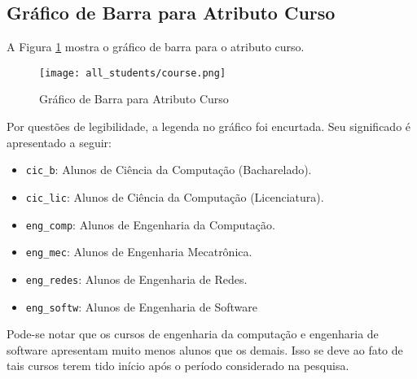 \subsection{Gráfico de Barra para Atributo Curso}
A Figura \ref{atr_course} mostra o gráfico de barra para o atributo curso. 

\begin{figure}[!ht]
    \caption{Gráfico de Barra para Atributo Curso}
    \centering
    \texttt{[image: all\_students/course.png]}
    \label{atr_course}
\end{figure}

Por questões de legibilidade, a legenda no gráfico foi encurtada. Seu significado é
apresentado a seguir: 
\begin{itemize}
    \item \texttt{cic\_b}: Alunos de Ciência da Computação (Bacharelado).
    \item \texttt{cic\_lic}: Alunos de Ciência da Computação (Licenciatura).
    \item \texttt{eng\_comp}: Alunos de Engenharia da Computação.
    \item \texttt{eng\_mec}: Alunos de Engenharia Mecatrônica.
    \item \texttt{eng\_redes}: Alunos de Engenharia de Redes. 
    \item \texttt{eng\_softw}: Alunos de Engenharia de Software
\end{itemize}

Pode-se notar que os cursos de engenharia da computação e engenharia de software
apresentam muito menos alunos que os demais. Isso se deve ao fato de tais cursos
terem tido início após o período considerado na pesquisa. 
\clearpage


